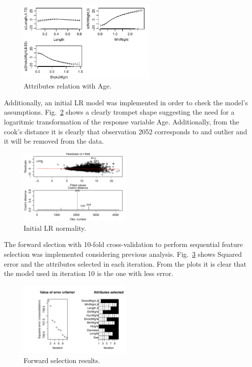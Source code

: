 \documentclass[10pt, paper=a4]{article}
\begin{document}
\begin{figure}[h]
  \centering
  \includegraphics[width = 0.60\textwidth]{gam.pdf}
  \caption{Attributes relation with Age.}
  \label{fig:gam}
\end{figure}

Additionally, an initial LR model was implemented in order to check
the model's assumptions. Fig.~\ref{fig:modelcheck} shows a clearly
trompet shape suggesting the need for a logaritmic transformation of
the response variable Age. Additionally, from the cook's distance it
is clearly that observation 2052 corresponds to and outlier and it
will be removed from the data.

\newpage
\begin{figure}[h]
  \centering
  \includegraphics[width = 0.49\textwidth]{modelcheck.pdf}
  \caption{Initial LR normality.}
  \label{fig:modelcheck}
\end{figure}

The forward slection with 10-fold cross-validation to perform
sequential feature selection was implemented considering previous
analysis. Fig.~\ref{fig:forwardselection} shows Squared error and the
attributes selected in each iteration. From the plots it is clear that
the model used in iteration 10 is the one with less error.

\begin{figure}[h]
  \centering
  \includegraphics[width = 0.49\textwidth]{forwardselection.pdf}
  \caption{Forward selection results.}
  \label{fig:forwardselection}
\end{figure}
\end{document}
